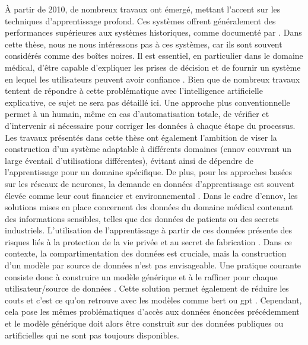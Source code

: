 À partir de 2010, de nombreux travaux ont émergé, mettant l'accent sur les techniques d'apprentissage profond.
Ces systèmes offrent généralement des performances supérieures aux systèmes historiques, comme documenté par \cite{al-aswadiAutomaticOntologyConstruction2020}.
Dans cette thèse, nous ne nous intéressons pas à ces systèmes, car ils sont souvent considérés comme des boîtes noires.
Il est essentiel, en particulier dans le domaine médical, d'être capable d'expliquer les prises de décision et de fournir un système en lequel les utilisateurs peuvent avoir confiance \cite{ribeiroWhyShouldTrust2016}.
Bien que de nombreux travaux tentent de répondre à cette problématique avec l'intelligence artificielle explicative, ce sujet ne sera pas détaillé ici.
Une approche plus conventionnelle permet à un humain, même en cas d'automatisation totale, de vérifier et d'intervenir si nécessaire pour corriger les données à chaque étape du processus.
Les travaux présentés dans cette thèse ont également l'ambition de viser la construction d'un système adaptable à différents domaines (\gls{ennov} couvrant un large éventail d'utilisations différentes), évitant ainsi de dépendre de l'apprentissage pour un domaine spécifique.
De plus, pour les approches basées sur les réseaux de neurones, la demande en données d'apprentissage est souvent élevée comme leur cout financier et environnemental \cite{strubellEnergyPolicyConsiderations2019}.
Dans le cadre d'\gls{ennov}, les solutions mises en place concernent des données du domaine médical contenant des informations sensibles, telles que des données de patients ou des secrets industriels.
L'utilisation de l'apprentissage à partir de ces données présente des risques liés à la protection de la vie privée et au secret de fabrication \cite{fredriksonModelInversionAttacks2015,songPrivacyRisksSecuring2019}.
Dans ce contexte, la compartimentation des données est cruciale, mais la construction d'un modèle par source de données n'est pas envisageable.
Une pratique courante consiste donc à construire un modèle générique et à le raffiner pour chaque utilisateur/source de données \cite{ribeiroWhyShouldTrust2016}.
Cette solution permet également de réduire les couts et c'est ce qu'on retrouve avec les modèles comme \gls{bert} \cite{devlinBERTPretrainingDeep2019} ou \gls{gpt} \cite{radfordImprovingLanguageUnderstanding2018, brownLanguageModelsAre2020}. 
Cependant, cela pose les mêmes problématiques d'accès aux données énoncées précédemment et le modèle générique doit alors être construit sur des données publiques ou artificielles qui ne sont pas toujours disponibles.

